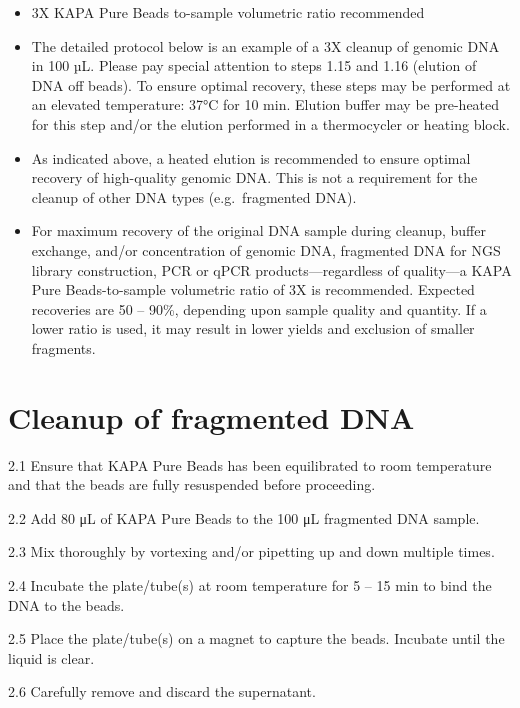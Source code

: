 \documentclass[
  letterpaper,
  DIV=11,
  numbers=noendperiod]{scrreprt}
\begin{document}
\begin{itemize}
\item
  3X KAPA Pure Beads to-sample volumetric ratio recommended
\item
  The detailed protocol below is an example of a 3X cleanup of genomic
  DNA in 100 µL. Please pay special attention to steps 1.15 and 1.16
  (elution of DNA off beads). To ensure optimal recovery, these steps
  may be performed at an elevated temperature: 37°C for 10 min. Elution
  buffer may be pre-heated for this step and/or the elution performed in
  a thermocycler or heating block.
\item
  As indicated above, a heated elution is recommended to ensure optimal
  recovery of high-quality genomic DNA. This is not a requirement for
  the cleanup of other DNA types (e.g.~fragmented DNA).
\item
  For maximum recovery of the original DNA sample during cleanup, buffer
  exchange, and/or concentration of genomic DNA, fragmented DNA for NGS
  library construction, PCR or qPCR products---regardless of quality---a
  KAPA Pure Beads-to-sample volumetric ratio of 3X is recommended.
  Expected recoveries are 50 -- 90\%, depending upon sample quality and
  quantity. If a lower ratio is used, it may result in lower yields and
  exclusion of smaller fragments.
\end{itemize}

\hypertarget{cleanup-of-fragmented-dna}{%
\section*{\texorpdfstring{\textbf{Cleanup of fragmented
DNA}}{Cleanup of fragmented DNA}}\label{cleanup-of-fragmented-dna}}

2.1 Ensure that KAPA Pure Beads has been equilibrated to room
temperature and that the beads are fully resuspended before proceeding.

2.2 Add 80 μL of KAPA Pure Beads to the 100 μL fragmented DNA sample.

2.3 Mix thoroughly by vortexing and/or pipetting up and down multiple
times.

2.4 Incubate the plate/tube(s) at room temperature for 5 -- 15 min to
bind the DNA to the beads.

2.5 Place the plate/tube(s) on a magnet to capture the beads. Incubate
until the liquid is clear.

2.6 Carefully remove and discard the supernatant.
\end{document}
